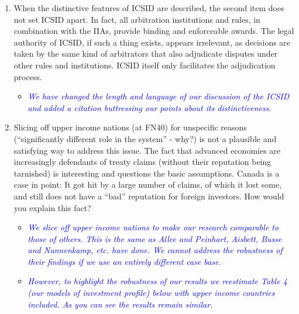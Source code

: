 \begin{enumerate}
	\item When the distinctive features of ICSID are described, the second item does not set ICSID apart. In fact, all arbitration institutions and rules, in combination with the IIAs, provide binding and enforceable awards. The legal authority of ICSID, if such a thing exists, appears irrelevant, as decisions are taken by the same kind of arbitrators that also adjudicate disputes under other rules and institutions. ICSID itself only facilitates the adjudication process. 
	\begin{itemize}
		\item \textcolor{blue}{ \emph{
		We have changed the length and language of our discussion of the ICSID and added a citation buttressing our points about its distinctiveness.
		}}
	\end{itemize}
	\item Slicing off upper income nations (at FN40) for unspecific reasons (``significantly different role in the system'' - why?) is not a plausible and satisfying way to address this issue. The fact that advanced economies are increasingly defendants of treaty claims (without their reputation being tarnished) is interesting and questions the basic assumptions. Canada is a case in point: It got hit by a large number of claims, of which it lost some, and still does not have a ``bad'' reputation for foreign investors. How would you explain this fact?	
	\begin{itemize}
		\item \textcolor{blue}{ \emph{ 
		We slice off upper income nations to make our research comparable to those of others. This is the same as Allee and Peinhart, Aisbett, Busse and Nunnenkamp, etc. have done. We cannot address the robustness of their findings if we use an entirely different case base. 
		}}
		\item \textcolor{blue}{ \emph{ 
		However, to highlight the robustness of our results we reestimate Table 4 (our models of investment profile) below with upper income countries included. As you can see the results remain similar. 
		}}


\end{itemize}
\end{enumerate}
